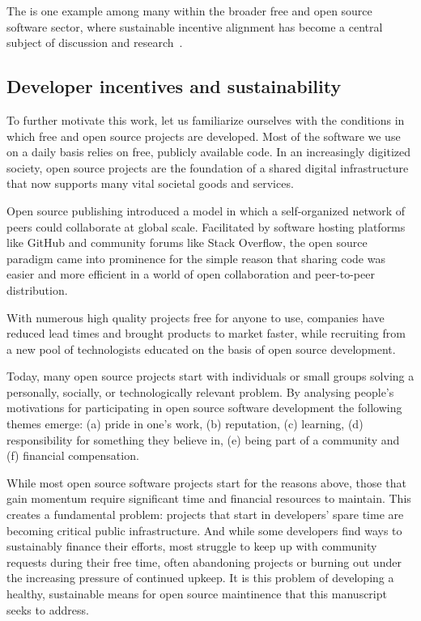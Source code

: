 The is one example among many within the broader free and open source software
sector, where sustainable incentive alignment has become a central subject of discussion
and research~\cite{roads and bridges}.

\subsection{Developer incentives and sustainability}
\label{s:incentives}

To further motivate this work, let us familiarize ourselves with the
conditions in which free and open source projects are developed. Most of the software
we use on a daily basis relies on free, publicly available code. In an increasingly
digitized society, open source projects are the foundation of
a shared digital infrastructure that now supports many vital societal goods and services.

Open source publishing introduced a model in which a self-organized network of peers
could collaborate at global scale. Facilitated by software hosting platforms like GitHub
and community forums like Stack Overflow, the open source paradigm came into prominence
for the simple reason that sharing code was easier and more efficient
in a world of open collaboration and peer-to-peer distribution.

With numerous high quality projects free for anyone to use,
companies have reduced lead times and brought products to market
faster, while recruiting from a new pool of technologists educated on the basis of
open source development.

Today, many open source projects start with individuals or small groups
solving a personally, socially, or technologically relevant problem. By
analysing people's motivations for participating in open source software
development the following themes emerge: (a) pride in one's work, (b)
reputation, (c) learning, (d) responsibility for something they believe in, (e)
being part of a community and (f) financial compensation.


While most open source software projects start for the reasons above, those
that gain momentum require significant time and financial resources to maintain.
This creates a fundamental problem: projects that start in developers' spare time
are becoming critical public infrastructure. And while some developers
find ways to sustainably finance their efforts, most struggle to keep up with
community requests during their free time, often abandoning
projects or burning out under the increasing pressure of continued upkeep.
It is this problem of developing a healthy, sustainable means for open source
maintinence that this manuscript seeks to address.

